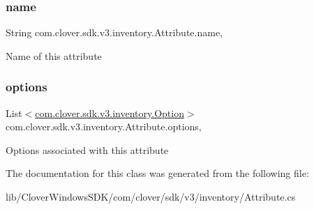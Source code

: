 \subsubsection{\texorpdfstring{name}{name}}
{\footnotesize\ttfamily String com.\+clover.\+sdk.\+v3.\+inventory.\+Attribute.\+name\hspace{0.3cm}{\ttfamily [get]}, {\ttfamily [set]}}



Name of this attribute 

\mbox{\label{classcom_1_1clover_1_1sdk_1_1v3_1_1inventory_1_1_attribute_a1d428824d832818f79da2c6695c732a2}} 
\subsubsection{\texorpdfstring{options}{options}}
{\footnotesize\ttfamily List$<$\hyperlink{classcom_1_1clover_1_1sdk_1_1v3_1_1inventory_1_1_option}{com.\+clover.\+sdk.\+v3.\+inventory.\+Option}$>$ com.\+clover.\+sdk.\+v3.\+inventory.\+Attribute.\+options\hspace{0.3cm}{\ttfamily [get]}, {\ttfamily [set]}}



Options associated with this attribute 



The documentation for this class was generated from the following file\+:\begin{DoxyCompactItemize}
\item 
lib/\+Clover\+Windows\+S\+D\+K/com/clover/sdk/v3/inventory/Attribute.\+cs\end{DoxyCompactItemize}
